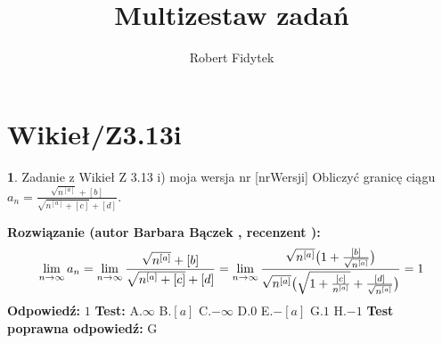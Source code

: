 \documentclass[12pt, a4paper]{article}
\title{Multizestaw zadań}
\author{Robert Fidytek}
\date{}
\theoremstyle{definition} %
\newtheorem{zad}{}
\newcommand{\kategoria}[1]{\section{#1}} %
\newcommand{\zadStart}[1]{\begin{zad}#1\newline} %
\newcommand{\zadStop}{\end{zad}}   %
\newcommand{\rozwStart}[2]{\noindent \textbf{Rozwiązanie (autor #1 , recenzent #2): }\newline} %
\newcommand{\rozwStop}{\newline}                                            %
\newcommand{\odpStart}{\noindent \textbf{Odpowiedź:}\newline}    %
\newcommand{\odpStop}{\newline}                                             %
\newcommand{\testStart}{\noindent \textbf{Test:}\newline} %
\newcommand{\testStop}{\newline} %
\newcommand{\kluczStart}{\noindent \textbf{Test poprawna odpowiedź:}\newline} %
\newcommand{\kluczStop}{\newline} %
\begin{document}
\maketitle


\kategoria{Wikieł/Z3.13i}
\zadStart{Zadanie z Wikieł Z 3.13 i) moja wersja nr [nrWersji]}
Obliczyć granicę ciągu $a_n= \frac{\sqrt{n^{[a]}}+[b]}{\sqrt{n^{[a]} +[c]}+[d]}$.
\zadStop
\rozwStart{Barbara Bączek}{}
$$\lim_{n \rightarrow \infty} a_n= \lim_{n \rightarrow \infty}  \frac{\sqrt{n^{[a]}}+[b]}{\sqrt{n^{[a]} +[c]}+[d]}= \lim_{n \rightarrow \infty} \frac{\sqrt{n^{[a]}}\big{(}1+\frac{[b]}{\sqrt{n^{[a]}}}\big{)}}{\sqrt{n^{[a]}}\big{(}\sqrt{1+\frac{[c]}{n^{[a]}}}+\frac{[d]}{\sqrt{n^{[a]}}}\big{)}} =1$$
\rozwStop
\odpStart
$1$
\odpStop
\testStart
A.$\infty$
B.$[a]$
C.$-\infty$
D.$0$
E.$-[a]$
G.$1$
H.$-1$
\testStop
\kluczStart
G
\kluczStop
\end{document}
